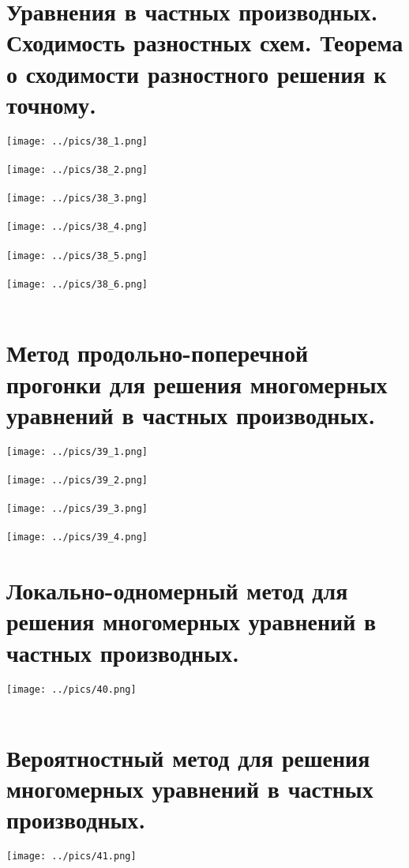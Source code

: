 \documentclass[12pt,a4paper]{article}
\begin{document}
	\section{Уравнения в частных производных. Сходимость разностных схем. Теорема о сходимости разностного решения к точному.}	
	\texttt{[image: ../pics/38\_1.png]}\\\\
	\texttt{[image: ../pics/38\_2.png]}\\\\
	\texttt{[image: ../pics/38\_3.png]}\\\\
	\texttt{[image: ../pics/38\_4.png]}\\\\
	\texttt{[image: ../pics/38\_5.png]}\\\\
	\texttt{[image: ../pics/38\_6.png]}\\\\
	\section{Метод продольно-поперечной прогонки для решения многомерных уравнений в частных производных.}	
	\texttt{[image: ../pics/39\_1.png]}\\\\
	\texttt{[image: ../pics/39\_2.png]}\\\\
	\texttt{[image: ../pics/39\_3.png]}\\\\
	\texttt{[image: ../pics/39\_4.png]}\\
	\section{Локально-одномерный метод для решения многомерных уравнений в частных производных.}
	\texttt{[image: ../pics/40.png]}\\\\		
	\section{Вероятностный метод для решения многомерных уравнений в частных производных.}
	\texttt{[image: ../pics/41.png]}\\\\
	
\end{document}
